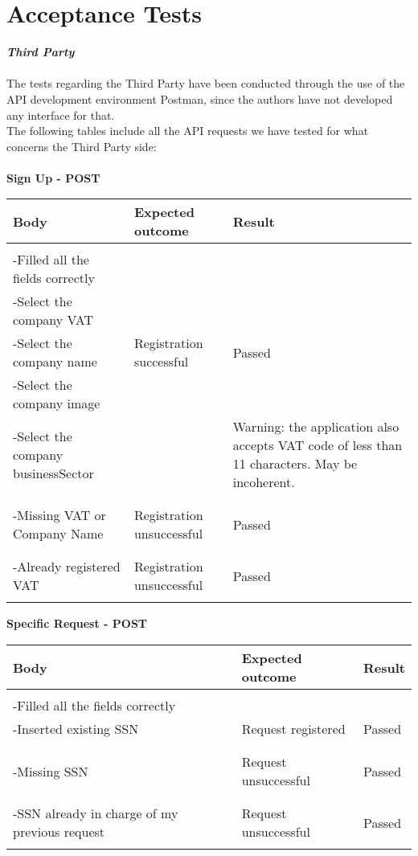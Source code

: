 \section{Acceptance Tests}
\textbf{\textit{Third Party}}\\\\
The tests regarding the Third Party have been conducted through the use of the API development environment Postman, since the authors have not developed any interface for that.\\ The following tables include all the API requests we have tested for what concerns the Third Party side:\\\\
\textbf{Sign Up - POST}
\begin{center}
	\begin{tabular}{|p{}|p{}|p{}|}
		\hline
		Body & Expected outcome & Result \\
		\hline
		&&\\
		-Filled all the fields correctly&&\\
		-Select the company VAT&&\\
		-Select the company name&Registration successful&Passed \\
		-Select the company image&&\\
		-Select the company businessSector&&Warning: the application also accepts VAT code of less than 11 characters. May be incoherent.\\
		&&\\
		\hline
		&&\\
		-Missing VAT or Company Name&Registration unsuccessful&Passed\\
		&&\\
		\hline
		&&\\
		-Already registered VAT&Registration unsuccessful&Passed\\
		&&\\
		\hline
	\end{tabular}
\end{center}
\newpage
\textbf{Specific Request - POST}
\begin{center}
	\begin{tabular}{|p{}|p{}|p{}|}
		\hline
		Body & Expected outcome & Result \\
		\hline
		&&\\
		-Filled all the fields correctly&&\\
		-Inserted existing SSN&Request registered&Passed\\
		&&\\
		\hline
		&&\\
		-Missing SSN &Request unsuccessful&Passed\\
		&&\\
		\hline
		&&\\
		-SSN already in charge of my previous request&Request unsuccessful&Passed\\
		&&\\
		\hline
	\end{tabular}
\end{center}

